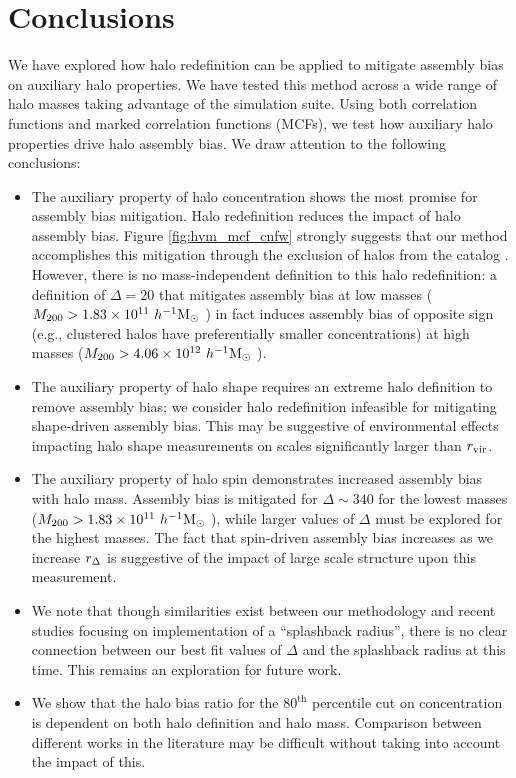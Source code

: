 \documentclass[usenatbib,fleqn]{mnras}
\begin{document}
\section[]{Conclusions}
\label{section:conclusions}

We have explored how halo redefinition can be applied to mitigate assembly bias on auxiliary halo properties. We have tested this method across a wide range of halo masses taking advantage of the \citet{diemer_kravtsov15} simulation suite. Using both correlation functions and marked correlation functions (MCFs), we test how auxiliary halo properties drive halo assembly bias. We draw attention to the following conclusions:
\begin{itemize}
    \item The auxiliary property of halo concentration  shows the most promise for assembly bias mitigation. Halo redefinition reduces the impact of halo assembly bias. Figure \ref{fig:hvm_mcf_cnfw} strongly suggests that our method accomplishes this mitigation through the exclusion of halos from the catalog . However, there is no mass-independent definition to this halo redefinition: a definition of $\Delta=20$ that mitigates assembly bias at low masses ($M_{200} > 1.83\times10^{11}\ h^{-1}\mathrm{M}_{\odot}~$) in fact induces assembly bias of opposite sign (e.g., clustered halos have preferentially smaller concentrations) at high masses ($M_{200} > 4.06\times10^{12}\ h^{-1}\mathrm{M}_{\odot}~$).
    \item The auxiliary property of halo shape requires an extreme halo definition to remove assembly bias; we consider halo redefinition infeasible for mitigating shape-driven assembly bias. This may be suggestive of environmental effects impacting halo shape measurements on scales significantly larger than $r_{\mathrm{vir}}$.
    \item The auxiliary property of halo spin demonstrates increased assembly bias with halo mass. Assembly bias is mitigated for $\Delta \sim 340$ for the lowest masses ($M_{200} > 1.83\times10^{11}\ h^{-1}\mathrm{M}_{\odot}~$), while larger values of $\Delta$ must be explored for the highest masses. The fact that spin-driven assembly bias increases as we increase $r_{\Delta}$ is suggestive of the impact of large scale structure upon this measurement.
    \item We note that though similarities exist between our methodology and recent studies \citep{more_etal15} focusing on implementation of a ``splashback radius'', there is no clear connection between our best fit values of $\Delta$ and the splashback radius at this time. This remains an exploration for future work.
    \item We show that the halo bias ratio for the $80^{\mathrm{th}}$ percentile cut on concentration is dependent on both halo definition and halo mass. Comparison between different works in the literature may be difficult without taking into account the impact of this.
\end{itemize}
\end{document}
